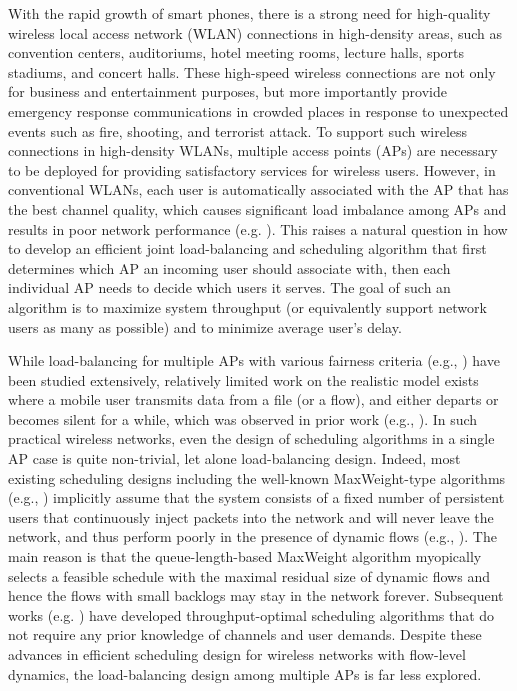 \documentclass[10pt, conference, letterpaper]{IEEEtran} %
\begin{document}
With the rapid growth of smart phones, there is a strong need for high-quality wireless local access network (WLAN) connections in high-density areas, such as convention centers, auditoriums, hotel meeting rooms, lecture halls, sports stadiums, and concert halls. These high-speed wireless connections are not only for business and entertainment purposes, but more importantly provide emergency response communications in crowded places in response to unexpected events such as fire, shooting, and terrorist attack. To support such wireless connections in high-density WLANs, multiple access points (APs) are necessary to be deployed for providing satisfactory services for wireless users. 
However, in conventional WLANs, each user is automatically associated with the AP that has the best channel quality, which causes significant load imbalance among APs and results in poor network performance (e.g. \cite{kotz2005analysis}). This raises a natural question in how to develop an efficient joint load-balancing and scheduling algorithm that first determines which AP an incoming user should associate with, then each individual AP needs to decide which users it serves. The goal of such an algorithm is to maximize system throughput (or equivalently support network users as many as possible) and to minimize average user's delay.

While load-balancing for multiple APs with various fairness criteria (e.g., \cite{bejerano2004fairness,gong2008dynamic,li2014ap,
athanasiou2015optimizing,dwijaksara2016joint,sun2017novel}) have been studied extensively, relatively limited work on the realistic model exists where a mobile user transmits data from a file (or a flow), and either departs or becomes silent for a while, which was observed in prior work (e.g., \cite{balachandran2002characterizing,kotz2005analysis}). In such practical wireless networks, even the design of scheduling algorithms in a single AP case is quite non-trivial, let alone load-balancing design. Indeed, most existing scheduling designs including the well-known MaxWeight-type algorithms (e.g., \cite{taseph92,taseph93}) implicitly assume that 
the system consists of a fixed number of persistent users that continuously inject packets into the network and will never leave the network, and thus perform poorly in the presence of dynamic flows (e.g., \cite{borst09, venbsying13}). The main reason is that the queue-length-based MaxWeight algorithm myopically selects a feasible schedule with the maximal residual size of dynamic flows and hence the flows with small backlogs may stay in the network forever. Subsequent works (e.g. \cite{yingsrikant10,yingsrikantsig10,sadiq09}) have developed throughput-optimal scheduling algorithms that do not require any prior knowledge of channels and user demands. Despite these advances in efficient scheduling design for wireless networks with flow-level dynamics, the load-balancing design among multiple APs is far less explored. 
\end{document}
